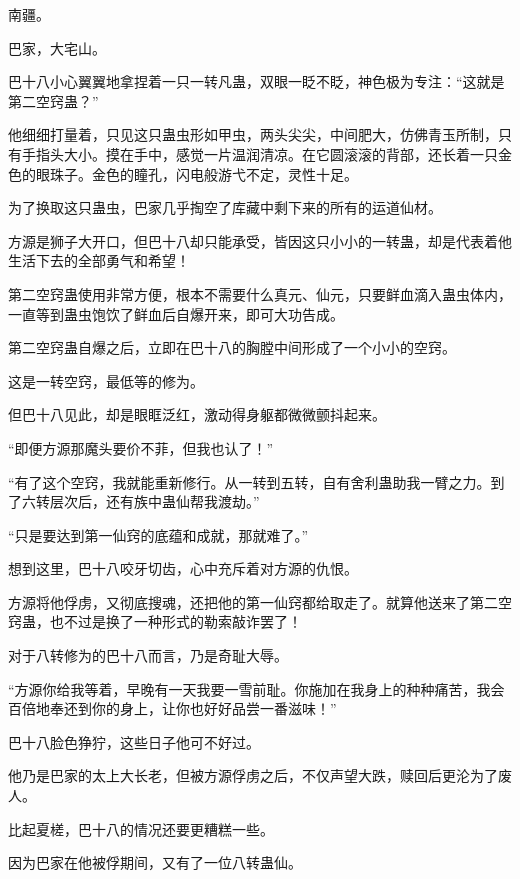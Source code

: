 
\begin{this_body}



南疆。

巴家，大宅山。

巴十八小心翼翼地拿捏着一只一转凡蛊，双眼一眨不眨，神色极为专注：“这就是第二空窍蛊？”

他细细打量着，只见这只蛊虫形如甲虫，两头尖尖，中间肥大，仿佛青玉所制，只有手指头大小。摸在手中，感觉一片温润清凉。在它圆滚滚的背部，还长着一只金色的眼珠子。金色的瞳孔，闪电般游弋不定，灵性十足。

为了换取这只蛊虫，巴家几乎掏空了库藏中剩下来的所有的运道仙材。

方源是狮子大开口，但巴十八却只能承受，皆因这只小小的一转蛊，却是代表着他生活下去的全部勇气和希望！

第二空窍蛊使用非常方便，根本不需要什么真元、仙元，只要鲜血滴入蛊虫体内，一直等到蛊虫饱饮了鲜血后自爆开来，即可大功告成。

第二空窍蛊自爆之后，立即在巴十八的胸膛中间形成了一个小小的空窍。

这是一转空窍，最低等的修为。

但巴十八见此，却是眼眶泛红，激动得身躯都微微颤抖起来。

“即便方源那魔头要价不菲，但我也认了！”

“有了这个空窍，我就能重新修行。从一转到五转，自有舍利蛊助我一臂之力。到了六转层次后，还有族中蛊仙帮我渡劫。”

“只是要达到第一仙窍的底蕴和成就，那就难了。”

想到这里，巴十八咬牙切齿，心中充斥着对方源的仇恨。

方源将他俘虏，又彻底搜魂，还把他的第一仙窍都给取走了。就算他送来了第二空窍蛊，也不过是换了一种形式的勒索敲诈罢了！

对于八转修为的巴十八而言，乃是奇耻大辱。

“方源你给我等着，早晚有一天我要一雪前耻。你施加在我身上的种种痛苦，我会百倍地奉还到你的身上，让你也好好品尝一番滋味！”

巴十八脸色狰狞，这些日子他可不好过。

他乃是巴家的太上大长老，但被方源俘虏之后，不仅声望大跌，赎回后更沦为了废人。

比起夏槎，巴十八的情况还要更糟糕一些。

因为巴家在他被俘期间，又有了一位八转蛊仙。


\end{this_body}
